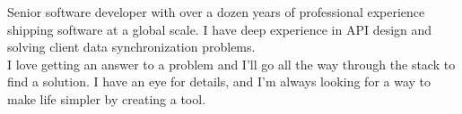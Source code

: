 

\begin{cvparagraph}

Senior software developer with over a dozen years of professional experience shipping software at a global scale. 
I have deep experience in API design and solving client data synchronization problems. \\
I love getting an answer to a problem and I'll go all the way through the stack to find a solution. 
I have an eye for details, and I'm always looking for a way to make life simpler by creating a tool.
\end{cvparagraph}
